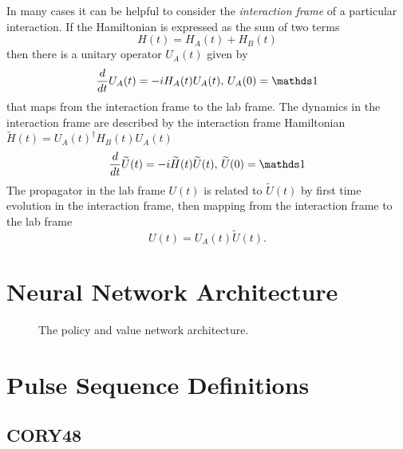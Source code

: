 In many cases it can be helpful to consider the \emph{interaction frame} of a particular interaction. If the Hamiltonian is expressed as the sum of two terms
\begin{equation}
    H(t) = H_A(t) + H_B(t)
\end{equation}
then there is a unitary operator $U_A(t)$ given by
\begin{equation}\label{eq:interaction-propagator}
    \frac{d}{dt} U_A(t) = -i H_A(t) U_A(t), \, U_A(0) = \identity
\end{equation}
that maps from the interaction frame to the lab frame.
The dynamics in the interaction frame are described by the interaction frame Hamiltonian $\widetilde{H}(t) = {U_A(t)}^{\dagger} H_B(t)U_A(t)$
\begin{equation}
    \frac{d}{dt}\widetilde{U}(t) = -i \widetilde{H}(t)\widetilde{U}(t),\, \widetilde{U}(0) = \identity
\end{equation}
The propagator in the lab frame $U(t)$ is related to $\widetilde{U}(t)$ by first time evolution in the interaction frame, then mapping from the interaction frame to the lab frame
\begin{equation}
    U(t) = U_A(t)\widetilde{U}(t).
\end{equation}

\section{Neural Network Architecture}

\begin{figure}[H]
    \centering
    
    \caption{The policy and value network architecture.}
    \label{fig:nn}
\end{figure}

\section{Pulse Sequence Definitions}

\subsection{CORY48}


